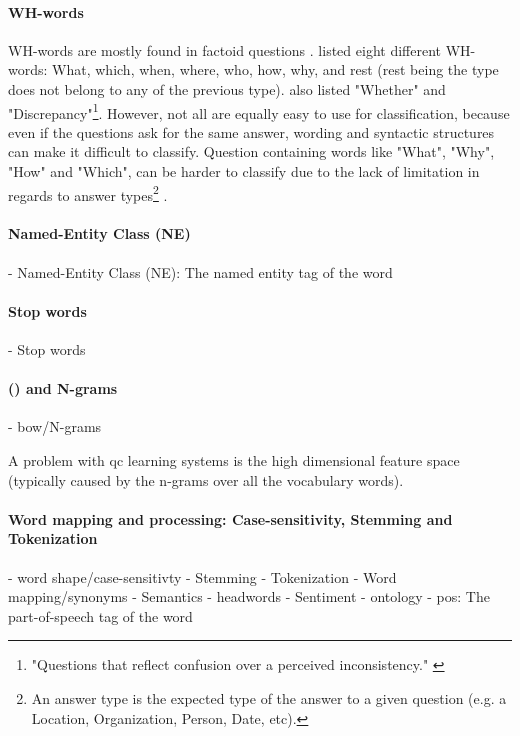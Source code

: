 \paragraph{WH-words}
\label{sec:wh_words}
WH-words are mostly found in factoid questions \cite{Lopez2011}. 
\textcite{Huang2008} listed eight different WH-words: What, which, when, where, who, how, why, and rest (rest being the type does not belong to any of the previous type). 
\textcite{Letovsky1987} also listed "Whether" and "Discrepancy"\footnote{
	"Questions that reflect confusion over a perceived inconsistency." \cite[p.~5]{Letovsky1987}
}.
However, not all are equally easy to use for classification, because even if the questions ask for the same answer, wording and syntactic structures can make it difficult to classify.
Question containing words like "What", "Why", "How" and "Which", can be harder to classify due to the lack of limitation in regards to answer types\footnote{
	An answer type is the expected type of the answer to a given question (e.g. a Location, Organization, Person, Date, etc). 
} \cite{Huang2008, Lopez2011}.


\paragraph{Named-Entity Class (NE)}
\label{sec:named_entities}
- Named-Entity Class (NE): The named entity tag of the word \cite{Xu2012, Sasaki2005, Heie2012}


\paragraph{Stop words}
\label{sec:stop_words}
- Stop words \cite{Wang2013, Manevitz2002, Zhang2003}


\paragraph[Bag-of-words and N-grams]{ () and N-grams}
\label{sec:bow}
- \gls{bow}/N-grams \cite{Bloehdorn2004, Yen2013, Lopez2011, Cavnar1994, Huang2008, Zhang2003}

A problem with \gls{qc} learning systems is the high dimensional feature space (typically caused by the n-grams over all the vocabulary words). \cite{Loni2011}


\paragraph{Word mapping and processing: Case-sensitivity, Stemming and Tokenization}
\label{sec:word_mapping_processing}
- word shape/case-sensitivty \cite{Huang2008, Loni2011}
- Stemming \cite{Xu2012, Wang2013}
- Tokenization  \cite{Xu2012, Wang2013}
- Word mapping/synonyms \cite{Yen2013, Bloehdorn2004}
- Semantics \cite{Bloehdorn2004, Lopez2011, Huang2008}
- headwords \cite{Loni2011, Huang2008}
- Sentiment \cite{Maas2011}
- ontology \cite{Lopez2011}
- \gls{pos}: The part-of-speech tag of the word \cite{Xu2012, Yen2013, Bloehdorn2004, Li, Heie2012}

